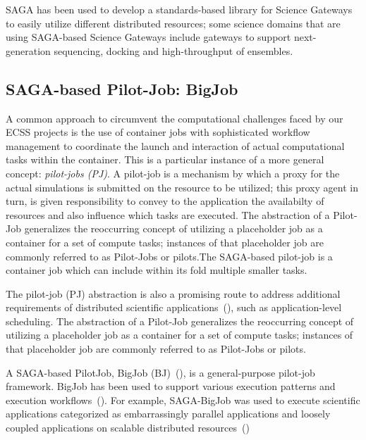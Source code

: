 \documentclass{sig-alternate}
\begin{document}
SAGA has been used to develop a standards-based library for Science
Gateways to easily utilize different distributed resources; some
science domains that are using SAGA-based Science Gateways include
gateways to support next-generation sequencing, docking and
high-throughput of ensembles.


\subsection{SAGA-based Pilot-Job: BigJob}

A common approach to circumvent the computational challenges faced by our ECSS
projects is the use of container jobs with sophisticated workflow management to
coordinate the launch and interaction of actual computational tasks within the
container. This is a particular instance of a more general
concept: \emph{pilot-jobs (PJ)}. A pilot-job is a mechanism by which a proxy
for the actual simulations is submitted on the resource to be
utilized; this proxy agent in turn, is given responsibility to convey
to the application the availabilty of resources and also influence
which tasks are executed. The abstraction of a Pilot-Job generalizes
the reoccurring concept of utilizing a placeholder job as a container
for a set of compute tasks; instances of that placeholder job are
commonly referred to as Pilot-Jobs or pilots.The SAGA-based pilot-job
is a container job which can include within its fold multiple smaller
tasks.

The pilot-job (PJ) abstraction is also a promising route to address
additional requirements of distributed scientific
applications~(\cite{ko-efficient,bigjob_cloudcom10}), such as
application-level scheduling. The abstraction of a Pilot-Job
generalizes the reoccurring concept of utilizing a placeholder job
as a container for a set of compute tasks; instances of that
placeholder job are commonly referred to as Pilot-Jobs or pilots.

A SAGA-based PilotJob, BigJob (BJ)~(\cite{bigjob_web,saga_bigjob_condor_cloud}),
is a general-purpose pilot-job framework. BigJob has been used to support
various execution patterns and execution
workflows~(\cite{async_repex11,repex_ptrsa}). For example, SAGA-BigJob was used
to execute scientific applications categorized as embarrassingly parallel
applications and loosely coupled applications on scalable distributed
resources~(\cite{ecmls_ccpe10, dare-ecmls11})
\end{document}
